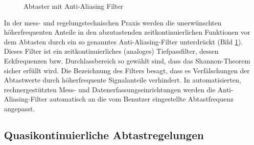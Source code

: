 \begin{figure}[ht]
	\centering
	\caption{Abtaster mit Anti-Aliasing Filter}
	\label{fig:6-9}
\end{figure}
In der mess- und regelungstechnischen Praxis werden die unerwünschten höherfrequenten Anteile in den abzutastenden zeitkontinuierlichen Funktionen vor dem Abtasten durch ein so genanntes Anti-Aliasing-Filter unterdrückt (Bild \ref{fig:6-9}).
Dieses Filter ist ein zeitkontinuierliches (analoges) Tiefpassfilter, dessen Eckfrequenzen bzw. Durchlassbereich so gewählt sind, dass das Shannon-Theorem sicher erfüllt wird.
Die Bezeichnung des Filters besagt, dass es Verfälschungen der Abtastwerte durch höherfrequente Signalanteile verhindert.
In automatisierten, rechnergestützten Mess- und Datenerfassungseinrichtungen werden die Anti-Aliasing-Filter automatisch an die vom Benutzer eingestellte Abtastfrequenz angepasst.


\subsection{Quasikontinuierliche Abtastregelungen}

